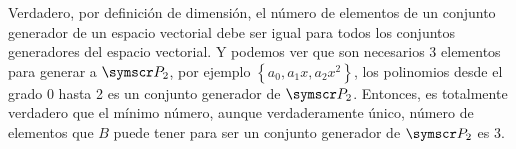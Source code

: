 \begin{enumerate}[label=\listAlph]
            Verdadero, por definición de dimensión, el número de elementos de un conjunto generador de un espacio vectorial debe 
            ser igual para todos los conjuntos generadores del espacio vectorial. 
            Y podemos ver que son necesarios 3 elementos para generar a \(\fp_2\), por ejemplo \(\left\{a_0, a_1x, a_2x^2\right\}\), 
            los polinomios desde el grado 0 hasta 2 es un conjunto generador de \(\fp_2\). 
            Entonces, es totalmente verdadero que el mínimo número, aunque verdaderamente único, número de elementos que \(B\)
            puede tener para ser un conjunto generador de \(\fp_2\) es 3.
    \end{enumerate}
